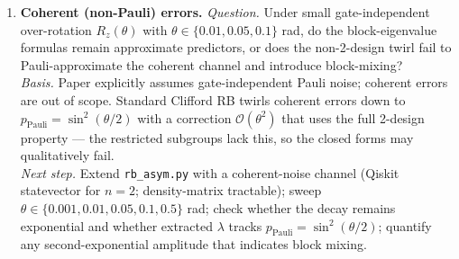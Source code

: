 \begin{enumerate}
\item \textbf{Coherent (non-Pauli) errors.}
\emph{Question.} Under small gate-independent over-rotation
$R_z(\theta)$ with $\theta \in \{0.01, 0.05, 0.1\}$ rad, do the
block-eigenvalue formulas remain approximate predictors, or does the
non-2-design twirl fail to Pauli-approximate the coherent channel and
introduce block-mixing?\\
\emph{Basis.} Paper explicitly assumes gate-independent Pauli noise;
coherent errors are out of scope. Standard Clifford RB twirls coherent
errors down to $p_{\mathrm{Pauli}} = \sin^2(\theta/2)$ with a correction
$\mathcal{O}(\theta^2)$ that uses the full 2-design property --- the
restricted subgroups lack this, so the closed forms may qualitatively
fail.\\
\emph{Next step.} Extend \texttt{rb\_asym.py} with a coherent-noise
channel (Qiskit statevector for $n=2$; density-matrix tractable);
sweep $\theta \in \{0.001, 0.01, 0.05, 0.1, 0.5\}$ rad; check
whether the decay remains exponential and whether extracted $\lambda$
tracks $p_{\mathrm{Pauli}} = \sin^2(\theta/2)$; quantify any
second-exponential amplitude that indicates block mixing.

\end{enumerate}
